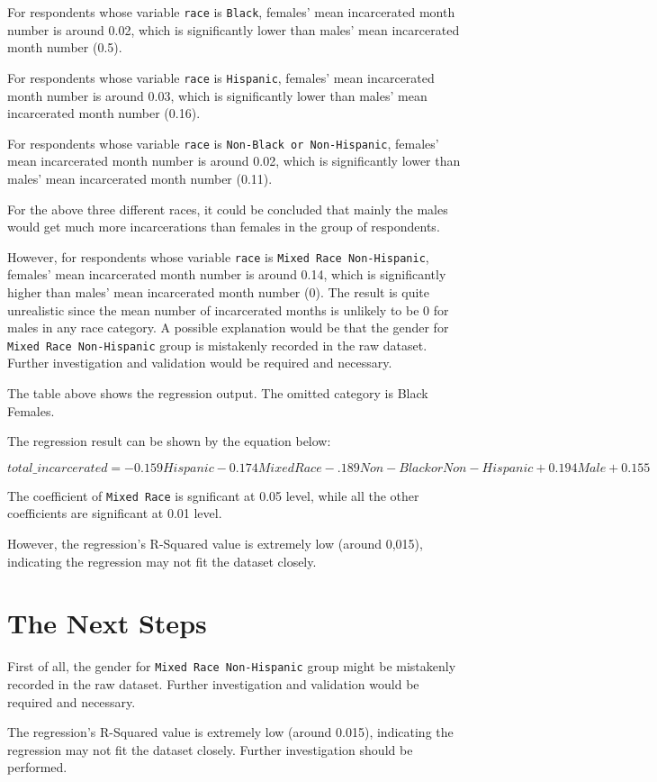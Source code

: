 \documentclass{article}
\begin{document}
For respondents whose variable \texttt{race} is \texttt{Black}, females' mean incarcerated month number is around 0.02, which is significantly lower than males' mean incarcerated month number (0.5). 

For respondents whose variable \texttt{race} is \texttt{Hispanic}, females' mean incarcerated month number is around 0.03, which is significantly lower than males' mean incarcerated month number (0.16). 

For respondents whose variable \texttt{race} is \texttt{Non-Black or Non-Hispanic}, females' mean incarcerated month number is around 0.02, which is significantly lower than males' mean incarcerated month number (0.11).

For the above three different races, it could be concluded that mainly the males would get much more incarcerations than females in the group of respondents.

However, for respondents whose variable \texttt{race} is \texttt{Mixed Race Non-Hispanic}, females' mean incarcerated month number is around 0.14, which is significantly higher than males' mean incarcerated month number (0). The result is quite unrealistic since the mean number of incarcerated months is unlikely to be 0 for males in any race category. A possible explanation would be that the gender for \texttt{Mixed Race Non-Hispanic} group is mistakenly recorded in the raw dataset. Further investigation and validation would be required and necessary.

\newpage



The table above shows the regression output. The omitted category is Black Females. 

The regression result can be shown by the equation below:

\begin{equation*}
    total\_incarcerated = -0.159 Hispanic - 0.174 Mixed Race - .189 Non-Black or Non-Hispanic + 0.194 Male + 0.155
\end{equation*}

The coefficient of \texttt{Mixed Race} is sgnificant at 0.05 level, while all the other coefficients are significant at 0.01 level.

However, the regression's R-Squared value is extremely low (around 0,015), indicating the regression may not fit the dataset closely.

\section{The Next Steps}

First of all, the gender for \texttt{Mixed Race Non-Hispanic} group might be mistakenly recorded in the raw dataset. Further investigation and validation would be required and necessary.

The regression's R-Squared value is extremely low (around 0.015), indicating the regression may not fit the dataset closely. Further investigation should be performed.
\end{document}
